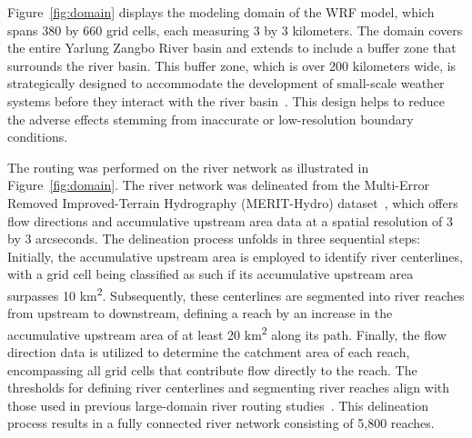 \documentclass[draft]{agujournal2019}
\begin{document}
Figure~\ref{fig:domain} displays the modeling domain of the WRF model, which spans 380 by 660 grid cells, each measuring 3 by 3 kilometers. The domain covers the entire Yarlung Zangbo River basin and extends to include a buffer zone that surrounds the river basin. This buffer zone, which is over 200 kilometers wide, is strategically designed to accommodate the development of small-scale weather systems before they interact with the river basin~\cite{denis2002CD}. This design helps to reduce the adverse effects stemming from inaccurate or low-resolution boundary conditions.

The routing was performed on the river network as illustrated in Figure~\ref{fig:domain}. The river network was delineated from the Multi-Error Removed Improved-Terrain Hydrography (MERIT-Hydro) dataset~\cite{yamazaki2017GRL, yamazaki2019WRR}, which offers flow directions and accumulative upstream area data at a spatial resolution of 3 by 3 arcseconds. The delineation process unfolds in three sequential steps: Initially, the accumulative upstream area is employed to identify river centerlines, with a grid cell being classified as such if its accumulative upstream area surpasses 10 km\textsuperscript{2}. Subsequently, these centerlines are segmented into river reaches from upstream to downstream, defining a reach by an increase in the accumulative upstream area of at least 20 km\textsuperscript{2} along its path. Finally, the flow direction data is utilized to determine the catchment area of each reach, encompassing all grid cells that contribute flow directly to the reach. The thresholds for defining river centerlines and segmenting river reaches align with those used in previous large-domain river routing studies~\cite{lin2021SD, lin2019WRR}. This delineation process results in a fully connected river network consisting of 5,800 reaches.
\end{document}
